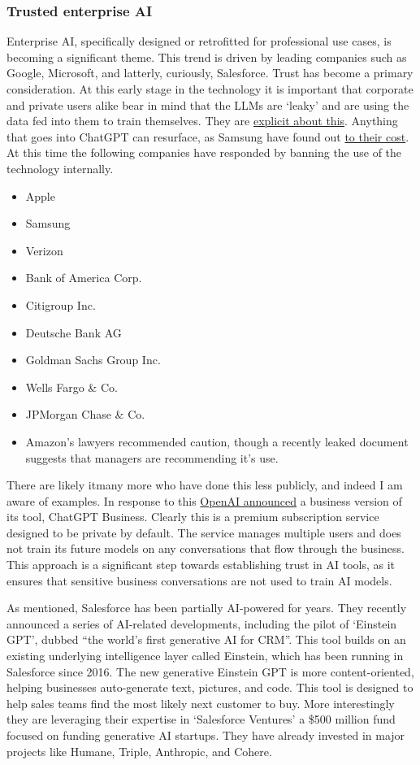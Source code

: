 \subsubsection{Trusted enterprise AI}
Enterprise AI, specifically designed or retrofitted for professional use cases, is becoming a significant theme. This trend is driven by leading companies such as Google, Microsoft, and latterly, curiously, Salesforce. Trust has become a primary consideration. At this early stage in the technology it is important that corporate and private users alike bear in mind that the LLMs are `leaky' and are using the data fed into them to train themselves. They are \href{https://help.openai.com/en/articles/6783457-chatgpt-general-faq}{explicit about this}. Anything that goes into ChatGPT can resurface, as Samsung have found out \href{https://cybernews.com/news/chatgpt-samsung-data-leak/}{to their cost}. At this time the following companies have responded by banning the use of the technology internally. 
\begin{itemize}
\item Apple
\item Samsung
\item Verizon
\item Bank of America Corp.
\item Citigroup Inc.
\item Deutsche Bank AG
\item Goldman Sachs Group Inc.
\item Wells Fargo \& Co.
\item JPMorgan Chase \& Co.
\item Amazon's lawyers recommended caution, though a recently leaked document suggests that managers are recommending it's use.
\end{itemize}
There are likely it{many} more who have done this less publicly, and indeed I am aware of examples. In response to this \href{https://openai.com/blog/new-ways-to-manage-your-data-in-chatgpt}{OpenAI announced} a business version of its tool, ChatGPT Business. Clearly this is a premium subscription service designed to be private by default. The service manages multiple users and does not train its future models on any conversations that flow through the business. This approach is a significant step towards establishing trust in AI tools, as it ensures that sensitive business conversations are not used to train AI models.\par
As mentioned, Salesforce has been partially AI-powered for years. They recently announced a series of AI-related developments, including the pilot of `Einstein GPT', dubbed ``the world's first generative AI for CRM''. This tool builds on an existing underlying intelligence layer called Einstein, which has been running in Salesforce since 2016. The new generative Einstein GPT is more content-oriented, helping businesses auto-generate text, pictures, and code. This tool is designed to help sales teams find the most likely next customer to buy. More interestingly they are leveraging their expertise in `Salesforce Ventures' a \$500 million fund focused on funding generative AI startups. They have already invested in major projects like Humane, Triple, Anthropic, and Cohere.\par
